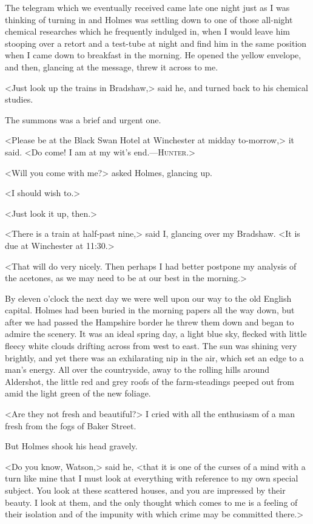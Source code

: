 The telegram which we eventually received came late one night just as I was thinking of turning in and Holmes was settling down to one of those all-night chemical researches which he frequently indulged in, when I would leave him stooping over a retort and a test-tube at night and find him in the same position when I came down to breakfast in the morning. He opened the yellow envelope, and then, glancing at the message, threw it across to me.

<Just look up the trains in Bradshaw,> said he, and turned back to his chemical studies.

The summons was a brief and urgent one.

<Please be at the Black Swan Hotel at Winchester at midday to-morrow,> it said. <Do come! I am at my wit's end.—\textsc{Hunter}.>

<Will you come with me?> asked Holmes, glancing up.

<I should wish to.>

<Just look it up, then.>

<There is a train at half-past nine,> said I, glancing over my Bradshaw. <It is due at Winchester at 11:30.>

<That will do very nicely. Then perhaps I had better postpone my analysis of the acetones, as we may need to be at our best in the morning.>

By eleven o'clock the next day we were well upon our way to the old English capital. Holmes had been buried in the morning papers all the way down, but after we had passed the Hampshire border he threw them down and began to admire the scenery. It was an ideal spring day, a light blue sky, flecked with little fleecy white clouds drifting across from west to east. The sun was shining very brightly, and yet there was an exhilarating nip in the air, which set an edge to a man's energy. All over the countryside, away to the rolling hills around Aldershot, the little red and grey roofs of the farm-steadings peeped out from amid the light green of the new foliage.

<Are they not fresh and beautiful?> I cried with all the enthusiasm of a man fresh from the fogs of Baker Street.

But Holmes shook his head gravely.

<Do you know, Watson,> said he, <that it is one of the curses of a mind with a turn like mine that I must look at everything with reference to my own special subject. You look at these scattered houses, and you are impressed by their beauty. I look at them, and the only thought which comes to me is a feeling of their isolation and of the impunity with which crime may be committed there.>

